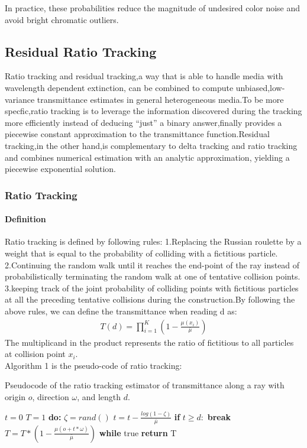 \documentclass[acmtog]{acmart}
\begin{document}
In practice, these probabilities reduce the magnitude of undesired color noise and avoid bright chromatic outliers.

\subsection{Residual Ratio Tracking}
Ratio tracking and residual tracking,a way that is able to handle media with wavelength dependent extinction, can be combined to compute unbiased,low-variance transmittance estimates in general heterogeneous media.To be more specfic,ratio tracking is to leverage the information discovered during the tracking more efficiently instead of deducing “just” a binary answer,finally provides a piecewise constant approximation to the transmittance function.Residual tracking,in the other hand,is complementary to delta tracking and ratio tracking and combines numerical estimation with an analytic approximation, yielding a piecewise exponential solution.
\subsubsection{Ratio Tracking}
\paragraph {\textbf{Definition}}
Ratio tracking is defined by following rules: 1.Replacing the Russian roulette by a weight that is equal to the probability of colliding with a fictitious particle. 2.Continuing the random walk until it reaches the end-point of the ray instead of probabilistically terminating the random walk at one of tentative collision points. 3.keeping track of the joint probability of colliding points with fictitious particles at all the preceding tentative collisions during the construction.By following the above rules, we can define the transmittance when reading d as:
\begin{equation}
	\begin{aligned}
		T(d)=\prod_{i=1}^{K}(1-\frac{\mu(x_{i})}{\bar{\mu}})
	\end{aligned}
\end{equation}
The multiplicand in the product represents the ratio of fictitious to all particles at collision point $x_i$.
\\Algorithm 1 is the pseudo-code of ratio tracking:
\begin{algorithm}[h]
	\caption{Pseudocode of the ratio tracking estimator of transmittance
		along a ray with origin $o$, direction $\omega$, and length $d$.}
	\begin{algorithmic}[1]
		\State $t=0$
		\State $T=1$
		\State \textbf{do:}
		\State  \qquad$\zeta=rand() $
		\State  \qquad$t=t-\frac{log(1-\zeta)}{\bar{\mu}} $
		\State  \qquad\textbf{if} $t\geq d:$ \textbf{break}
		\State  \qquad$T = T *(1-\frac{\mu(o+t*\omega)}{\bar{\mu}}) $
		\State \textbf{while} true
		\State \textbf{return} T
		\EndFunction  
	\end{algorithmic}
\end{algorithm}\\
\end{document}
